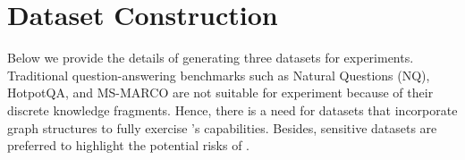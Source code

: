 


\begin{table}[!h]\footnotesize
\centering
\caption{}
\label{tbl:tertable}
  \def\arraystretch{1.2}
  \setlength{\tabcolsep}{2pt}
\end{table}




\section{Dataset Construction}

\label{sec:dataset}

Below we provide the details of generating three datasets for experiments. Traditional question-answering benchmarks such as Natural Questions (NQ), HotpotQA, and MS-MARCO are not suitable for \rag experiment because of their discrete knowledge fragments. Hence, there is a need for datasets that incorporate graph structures to fully exercise \rag's capabilities. Besides, sensitive datasets are preferred to highlight the potential risks of \attack.




